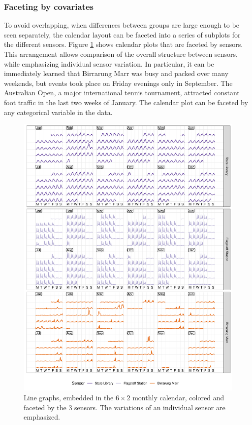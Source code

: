 \documentclass[12pt]{article}
\begin{document}
\hypertarget{faceting-by-covariates}{%
\subsubsection{Faceting by covariates}\label{faceting-by-covariates}}

To avoid overlapping, when differences between groups are large enough to be seen separately, the calendar layout can be faceted into a series of subplots for the different sensors. Figure \ref{fig:facet} shows calendar plots that are faceted by sensors. This arrangement allows comparison of the overall structure between sensors, while emphasizing individual sensor variation. In particular, it can be immediately learned that Birrarung Marr was busy and packed over many weekends, but events took place on Friday evenings only in September. The Australian Open, a major international tennis tournament, attracted constant foot traffic in the last two weeks of January. The calendar plot can be faceted by any categorical variable in the data.

\begin{figure}

{\centering \includegraphics[width=\textwidth]{figure/facet-1} 

}

\caption{Line graphs, embedded in the \(6 \times 2\) monthly calendar, colored and faceted by the 3 sensors. The variations of an individual sensor are emphasized.}\label{fig:facet}
\end{figure}
\end{document}
